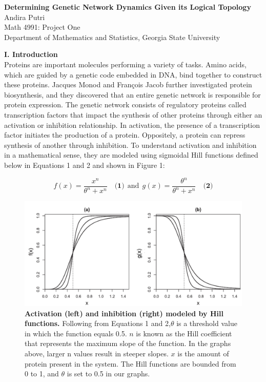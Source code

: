 \documentclass[11pt]{article}
\begin{document}
\begin{center}

 \textbf{Determining Genetic Network Dynamics Given its Logical Topology}\\
Andira Putri\\
Math 4991: Project One\\
Department of Mathematics and Statistics, Georgia State University \\

\end{center}

\textbf{I. Introduction}\\

Proteins are important molecules performing a variety of tasks. Amino acids, which are guided by a genetic code embedded in DNA, bind together to construct these proteins. Jacques Monod and François Jacob further investigated protein biosynthesis, and they discovered that an entire genetic network is responsible for protein expression. The genetic network consists of regulatory proteins called transcription factors that impact the synthesis of other proteins through either an activation or inhibition relationship. In activation, the presence of a transcription factor initiates the production of a protein. Oppositely, a protein can repress synthesis of another through inhibition. To understand activation and inhibition in a mathematical sense, they are modeled using sigmoidal Hill functions defined below in Equations 1 and 2 and shown in Figure 1:

\[ f(x)=\frac{x^n}{\theta ^n + x^n} \quad \textbf{(1)} \ \ \textrm{and}
\ \ g(x)=\frac{\theta^n}{\theta ^n + x^n} \quad \textbf{(2)} \]

\begin{figure}[h]
\centering
\includegraphics[scale=0.5]{figure1}
\caption{\textbf{Activation (left) and inhibition (right) modeled by Hill functions.} Following from Equations 1 and 2,$\theta$ is a threshold value in which the function equals 0.5. $n$ is known as the Hill coefficient that represents the maximum slope of the function. In the graphs above, larger n values result in steeper slopes. $x$ is the amount of protein present in the system. The Hill functions are bounded from 0 to 1, and $\theta$ is set to 0.5 in our graphs.}
\end{figure}
\end{document}
